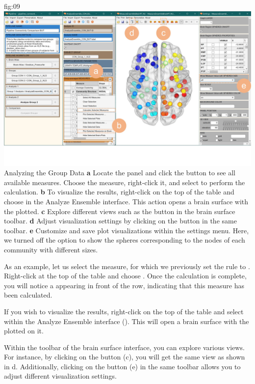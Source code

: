 \documentclass[justified]{tufte-handout}
\begin{document}
{fig:09}
{
	\includegraphics{fig09.jpg}
}
{Analyzing the Group Data}
{
	{\bf a} Locate the  panel and click the  button to see all available measures. Choose the  measure, right-click it, and select  to perform the calculation.
	{\bf b} To visualize the results, right-click on the top of the table and choose  in the Analyze Ensemble interface. This action opens a brain surface with the  plotted.
	{\bf c} Explore different views such as the  button in the brain surface toolbar.
	{\bf d} Adjust visualization settings by clicking on the  button in the same toolbar.
	{\bf e} Customize and save plot visualizations within the settings menu. Here, we turned off the option to show the spheres corresponding to the nodes of each community with different sizes.
}


As an example, let us select the  measure, for which we previously set the rule to . Right-click at the top of the table and choose . Once the calculation is complete, you will notice a  appearing in front of the  row, indicating that this measure has been calculated.

If you wish to visualize the results, right-click on the top of the table and select  within the Analyze Ensemble interface (). This will open a brain surface with the  plotted on it.

Within the toolbar of the brain surface interface, you can explore various views.
For instance, by clicking on the  button (c), you will get the same view as shown in d. Additionally, clicking on the  button (e) in the same toolbar allows you to adjust different visualization settings.
\end{document}
